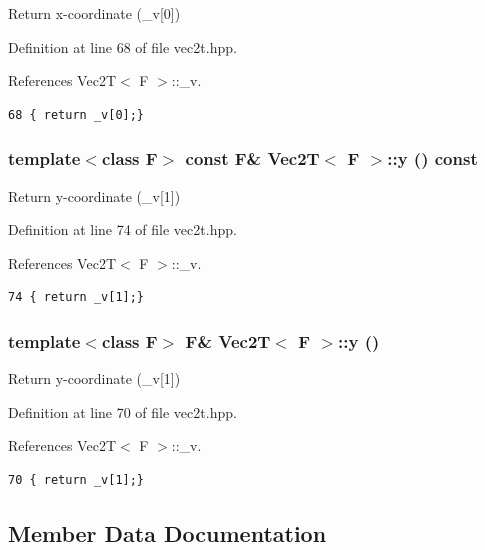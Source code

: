 Return x-coordinate (\_\-v[0]) 

Definition at line 68 of file vec2t.hpp.

References Vec2T$<$ F $>$::\_\-v.

\footnotesize\begin{verbatim}68 { return _v[0];}
\end{verbatim}\normalsize 


\subsubsection{\setlength{\rightskip}{0pt plus 5cm}template$<$class F$>$ const F\& {\bf Vec2T}$<$ F $>$::y () const\hspace{0.3cm}{\tt  [inline]}}\label{classVec2T_0aa081a05397b4edd9d072a1d05f25c3_0aa081a05397b4edd9d072a1d05f25c3}


Return y-coordinate (\_\-v[1]) 

Definition at line 74 of file vec2t.hpp.

References Vec2T$<$ F $>$::\_\-v.

\footnotesize\begin{verbatim}74 { return _v[1];}
\end{verbatim}\normalsize 


\subsubsection{\setlength{\rightskip}{0pt plus 5cm}template$<$class F$>$ F\& {\bf Vec2T}$<$ F $>$::y ()\hspace{0.3cm}{\tt  [inline]}}\label{classVec2T_1dd5a44efca58e87cf45e4453a1f7a02_1dd5a44efca58e87cf45e4453a1f7a02}


Return y-coordinate (\_\-v[1]) 

Definition at line 70 of file vec2t.hpp.

References Vec2T$<$ F $>$::\_\-v.

\footnotesize\begin{verbatim}70 { return _v[1];}
\end{verbatim}\normalsize 




\subsection{Member Data Documentation}
